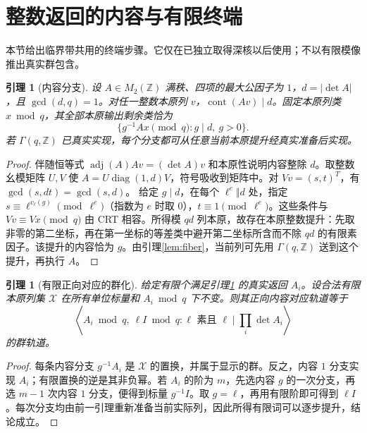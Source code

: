 \documentclass[11pt,a4paper]{article}
\newcommand{\ZZ}{\mathbb Z}
\newcommand{\diag}{\operatorname{diag}}
\newcommand{\cont}{\operatorname{cont}}
\newtheorem{lemma}[theorem]{引理}
\theoremstyle{definition}
\numberwithin{equation}{section}
\begin{document}
\section{整数返回的内容与有限终端}\label{sec:finite}
本节给出临界带共用的终端步骤。它仅在已独立取得深核以后使用；不以有限模像推出真实群包含。

\begin{lemma}[内容分支]\label{lem:content}
设 $A\in M_2(\ZZ)$ 满秩、四项的最大公因子为 $1$，$d=|\det A|$，且 $\gcd(d,q)=1$。对任一整数本原列 $v$，$\cont(Av)\mid d$。固定本原列类 $x\bmod q$，其全部本原输出剩余类恰为
\[\{g^{-1}Ax\pmod q:g\mid d,\ g>0\}.\]
若 $\Gamma(q,\ZZ)$ 已真实实现，每个分支都可从任意当前本原提升经真实准备后实现。
\end{lemma}
\begin{proof}
伴随恒等式 $\operatorname{adj}(A)Av=(\det A)v$ 和本原性说明内容整除 $d$。取整数幺模矩阵 $U,V$ 使 $A=U\diag(1,d)V$，符号吸收到矩阵中。对 $Vv=(s,t)^T$，有 $\gcd(s,dt)=\gcd(s,d)$。
给定 $g\mid d$，在每个 $\ell^e\Vert d$ 处，指定 $s\equiv\ell^{v_\ell(g)}\pmod{\ell^e}$（指数为 $e$ 时取 $0$），$t\equiv1\pmod{\ell^e}$。这些条件与 $Vv\equiv Vx\pmod q$ 由 CRT 相容。所得模 $qd$ 列本原，故存在本原整数提升：先取非零的第二坐标，再在第一坐标的等差类中避开第二坐标所含而不除 $qd$ 的有限素因子。该提升的内容恰为 $g$。由引理\ref{lem:fiber}，当前列可先用 $\Gamma(q,\ZZ)$ 送到这个提升，再执行 $A$。
\end{proof}

\begin{lemma}[有限正向对应的群化]\label{lem:finite-group}
给定有限个满足引理\ref{lem:content} 的真实返回 $A_i$。设合法有限本原列集 $\mathcal X$ 在所有单位标量和 $A_i\bmod q$ 下不变。则其正向内容对应轨道等于
\[
 \left\langle A_i\bmod q,\ \ell I\bmod q:\ell\text{ 素且 }\ell\mid\prod_i\det A_i\right\rangle
\]
的群轨道。
\end{lemma}
\begin{proof}
每条内容分支 $g^{-1}A_i$ 是 $\mathcal X$ 的置换，并属于显示的群。反之，内容 $1$ 分支实现 $A_i$；有限置换的逆是其非负幂。若 $A_i$ 的阶为 $m$，先选内容 $g$ 的一次分支，再选 $m-1$ 次内容 $1$ 分支，便得到标量 $g^{-1}I$。取 $g=\ell$，再用有限阶即可得到 $\ell I$。每次分支均由前一引理重新准备当前实际列，因此所得有限词可以逐步提升，结论成立。
\end{proof}
\end{document}
